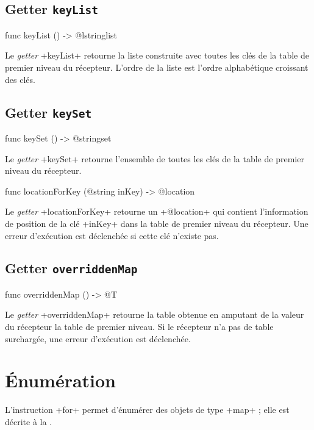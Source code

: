 \subsection{Getter \texttt{keyList}}

\begin{galgas}
func keyList () -> @lstringlist
\end{galgas}


Le \emph{getter} \ggs+keyList+ retourne la liste construite avec toutes les clés de la table de premier niveau du récepteur. L'ordre de la liste est l'ordre alphabétique croissant des clés.



\subsection{Getter \texttt{keySet}}

\begin{galgas}
func keySet () -> @stringset
\end{galgas}


Le \emph{getter} \ggs+keySet+ retourne l'ensemble de toutes les clés de la table de premier niveau du récepteur.






\begin{galgas}
func locationForKey (@string inKey) -> @location
\end{galgas}


Le \emph{getter} \ggs+locationForKey+ retourne un \ggs+@location+ qui contient l'information de position de la clé \ggs+inKey+ dans la table de premier niveau du récepteur. Une erreur d'exécution est déclenchée si cette clé n'existe pas.








\subsection{Getter \texttt{overriddenMap}}

\begin{galgas}
func overriddenMap () -> @T
\end{galgas}


Le \emph{getter} \ggs+overriddenMap+ retourne la table obtenue en amputant de la valeur du récepteur la table de premier niveau. Si le récepteur n'a pas de table surchargée, une erreur d'exécution est déclenchée.



\section{Énumération}

L'instruction \ggs+for+ permet d'énumérer des objets de type \ggs+map+ ; elle est décrite à la .


